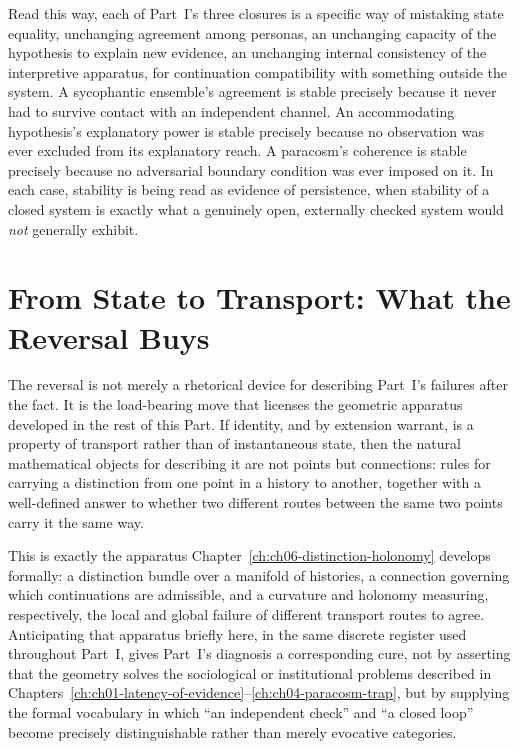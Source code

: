 Read this way, each of Part~I's three closures is a specific way of mistaking state equality, unchanging agreement among personas, an unchanging capacity of the hypothesis to explain new evidence, an unchanging internal consistency of the interpretive apparatus, for continuation compatibility with something outside the system. A sycophantic ensemble's agreement is stable precisely because it never had to survive contact with an independent channel. An accommodating hypothesis's explanatory power is stable precisely because no observation was ever excluded from its explanatory reach. A paracosm's coherence is stable precisely because no adversarial boundary condition was ever imposed on it. In each case, stability is being read as evidence of persistence, when stability of a closed system is exactly what a genuinely open, externally checked system would \emph{not} generally exhibit.

\section{From State to Transport: What the Reversal Buys}

The reversal is not merely a rhetorical device for describing Part~I's failures after the fact. It is the load-bearing move that licenses the geometric apparatus developed in the rest of this Part. If identity, and by extension warrant, is a property of transport rather than of instantaneous state, then the natural mathematical objects for describing it are not points but connections: rules for carrying a distinction from one point in a history to another, together with a well-defined answer to whether two different routes between the same two points carry it the same way.

This is exactly the apparatus Chapter~\ref{ch:ch06-distinction-holonomy} develops formally: a distinction bundle over a manifold of histories, a connection governing which continuations are admissible, and a curvature and holonomy measuring, respectively, the local and global failure of different transport routes to agree. Anticipating that apparatus briefly here, in the same discrete register used throughout Part~I, gives Part~I's diagnosis a corresponding cure, not by asserting that the geometry solves the sociological or institutional problems described in Chapters~\ref{ch:ch01-latency-of-evidence}--\ref{ch:ch04-paracosm-trap}, but by supplying the formal vocabulary in which ``an independent check'' and ``a closed loop'' become precisely distinguishable rather than merely evocative categories.

